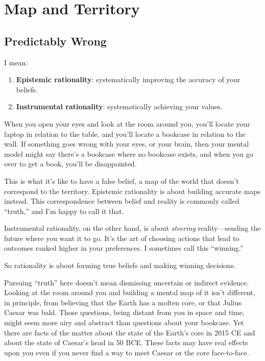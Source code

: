 \part{Map and Territory}


\chapter{Predictably Wrong}


{
 I mean:}

\begin{enumerate}
\item {
 \textbf{Epistemic rationality}: systematically improving the
accuracy of your beliefs.}

\item {
 \textbf{Instrumental rationality}: systematically achieving your
 values.}
\end{enumerate}

{
 When you open your eyes and look at the room around you,
you'll locate your laptop in relation to the table, and
you'll locate a bookcase in relation to the wall. If
something goes wrong with your eyes, or your brain, then your mental
model might say there's a bookcase where no bookcase
exists, and when you go over to get a book, you'll be
disappointed.}

{
 This is what it's like to have a false belief, a
map of the world that doesn't correspond to the
territory. Epistemic rationality is about building accurate maps
instead. This correspondence between belief and reality is commonly
called ``truth,'' and
I'm happy to call it that.}

{
 Instrumental rationality, on the other hand, is about
\textit{steering} reality---sending the future where you want it to go.
It's the art of choosing actions that lead to outcomes
ranked higher in your preferences. I sometimes call this
``winning.''}

{
 So rationality is about forming true beliefs and making winning
decisions.}

{
 Pursuing ``truth'' here
doesn't mean dismissing uncertain or indirect evidence.
Looking at the room around you and building a mental map of it
isn't different, in principle, from believing that the
Earth has a molten core, or that Julius Caesar was bald. Those
questions, being distant from you in space and time, might seem more
airy and abstract than questions about your bookcase. Yet there are
facts of the matter about the state of the Earth's core
in 2015 CE and about the state of Caesar's head in 50
BCE. These facts may have real effects upon you even if you never find
a way to meet Caesar or the core face-to-face.}

